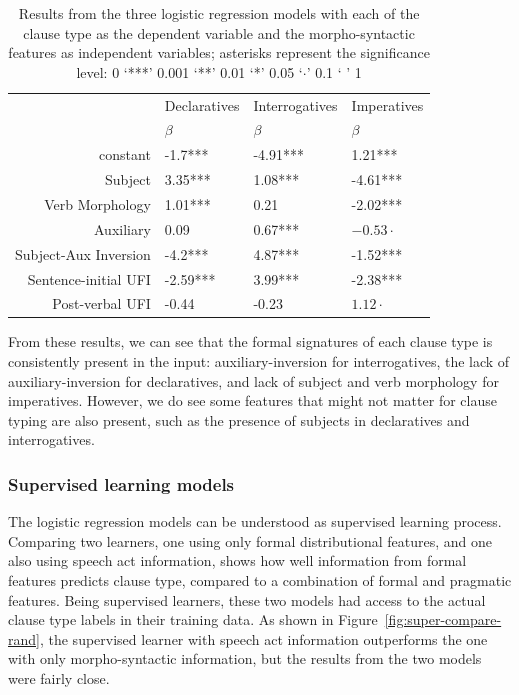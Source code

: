 \begin{table}[H]
\begin{center}
\begin{tabular}{r|l|l|l}
\hline
 & Declaratives   & Interrogatives   & Imperatives \\
 & $\beta$  & $\beta$  & $\beta$ \\
 \hline\hline
constant & -1.7*** & -4.91*** & 1.21*** \\
\hline
Subject & 3.35*** & 1.08*** & -4.61*** \\
\hline
Verb Morphology & 1.01*** & 0.21  & -2.02*** \\
\hline
Auxiliary & 0.09  & 0.67*** & $-0.53{\cdot}$ \\
\hline
Subject-Aux Inversion & -4.2*** & 4.87*** & -1.52*** \\
\hline
Sentence-initial UFI & -2.59*** & 3.99*** & -2.38*** \\
\hline
Post-verbal UFI & -0.44  & -0.23  & $1.12{\cdot}$ \\
\hline \hline
\end{tabular}
\end{center}
\caption{Results from the three logistic regression models with each of the clause type as the dependent variable and the morpho-syntactic features as independent variables; asterisks represent the significance level: 0 ‘***’ 0.001 ‘**’ 0.01 ‘*’ 0.05 ‘$\cdot$’ 0.1 ‘ ’ 1}
\label{tab:engcl:real-synstats}
\end{table}%

From these results, we can see that the formal signatures of each clause type is consistently present in the input: auxiliary-inversion for interrogatives, the lack of auxiliary-inversion for declaratives, and lack of subject and verb morphology for imperatives. However, we do see some features that might not matter for clause typing are also present, such as the presence of subjects in declaratives and interrogatives. 

\subsubsection{Supervised learning models}
\label{sec:engcl:corpus:supervised}

The logistic regression models can be understood as supervised learning process.
Comparing two learners, one using only formal distributional features, and one also using speech act information, shows how well information from formal features predicts clause type, compared to a combination of formal and pragmatic features. Being supervised learners, these two models had access to the actual clause type labels in their training data. As shown in Figure~\ref{fig:super-compare-rand}, the supervised learner with speech act information outperforms the one with only morpho-syntactic information, but the results from the two models were fairly close.


